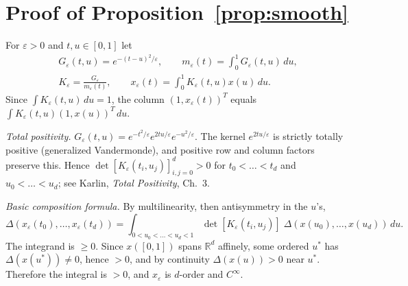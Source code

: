 \documentclass[11pt]{amsart}
\theoremstyle{definition}
\newcommand{\R}{\mathbb{R}}
\begin{document}
\section{Proof of Proposition~\ref{prop:smooth}}

For $\varepsilon>0$ and $t,u\in[0,1]$ let
\begin{gather*}
G_\varepsilon(t,u)=e^{-(t-u)^2/\varepsilon},\qquad m_\varepsilon(t)=\int_0^1G_\varepsilon(t,u)\,du,\\
K_\varepsilon=\frac{G_\varepsilon}{m_\varepsilon(t)},\qquad x_\varepsilon(t)=\int_0^1K_\varepsilon(t,u)x(u)\,du .
\end{gather*}
Since $\int K_\varepsilon(t,u)\,du=1$, the column $(1,x_\varepsilon(t))^T$ equals $\int K_\varepsilon(t,u)(1,x(u))^T\,du$.

\emph{Total positivity.} $G_\varepsilon(t,u)=e^{-t^2/\varepsilon}e^{2tu/\varepsilon}e^{-u^2/\varepsilon}$. The kernel $e^{2tu/\varepsilon}$ is
strictly totally positive (generalized Vandermonde), and positive row and column factors preserve this. Hence
$\det[K_\varepsilon(t_i,u_j)]_{i,j=0}^d>0$ for $t_0<\dots<t_d$ and $u_0<\dots<u_d$; see Karlin, \emph{Total Positivity}, Ch.~3.

\emph{Basic composition formula.} By multilinearity, then antisymmetry in the $u$'s,
\[
\Delta(x_\varepsilon(t_0),\dots,x_\varepsilon(t_d))=\int_{0<u_0<\dots<u_d<1}\det[K_\varepsilon(t_i,u_j)]\;\Delta(x(u_0),\dots,x(u_d))\,du.
\]
The integrand is $\ge0$. Since $x([0,1])$ spans $\R^d$ affinely, some ordered $u^*$ has $\Delta(x(u^*))\ne0$, hence $>0$, and by continuity
$\Delta(x(u))>0$ near $u^*$. Therefore the integral is $>0$, and $x_\varepsilon$ is $d$-order and $C^\infty$.
\end{document}
